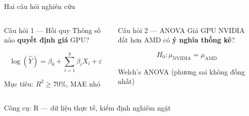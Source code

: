 \documentclass[13pt, aspectratio=169]{beamer}
\newcommand{\hl}[1]{\textcolor{red!75!black}{\textbf{#1}}}
\begin{document}
\begin{frame}{Hai câu hỏi nghiên cứu}
  \begin{columns}[T]
      \begin{block}{\normalsize Câu hỏi 1 --- Hồi quy}
        \vspace{0.3em}
        \centering
        Thông số nào \hl{quyết định giá} GPU?
        \vspace{0.4em}

        \[\log(\hat{Y}) = \beta_0 + \sum_{i=1}^{k}\beta_i X_i + \varepsilon\]

        \footnotesize Mục tiêu: $R^2 \geq 70\%$, MAE nhỏ
      \end{block}
      \begin{block}{\normalsize Câu hỏi 2 --- ANOVA}
        \vspace{0.3em}
        \centering
        Giá GPU NVIDIA đắt hơn AMD có \hl{ý nghĩa thống kê}?
        \vspace{0.4em}

        \[H_0\colon \mu_{\text{NVIDIA}} = \mu_{\text{AMD}}\]

        \footnotesize Welch's ANOVA (phương sai không đồng nhất)
      \end{block}
  \end{columns}
  \vspace{0.5em}
  \begin{center}
    \footnotesize
    \textcolor{gray!70}{Công cụ: R --- dữ liệu thực tế, kiểm định nghiêm ngặt}
  \end{center}
\end{frame}
\end{document}
